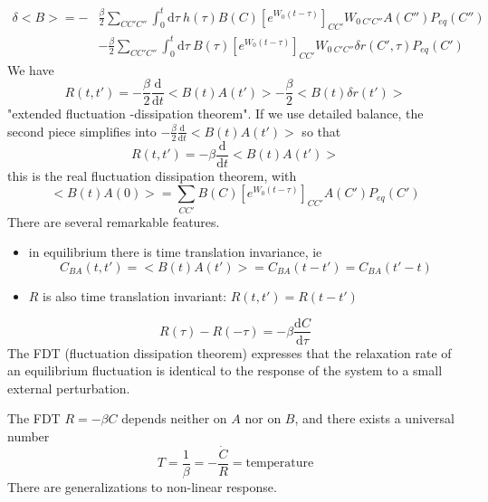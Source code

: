 \documentclass[a4paper]{book}
\theoremstyle{definition}
\theoremstyle{remark}
\begin{document}
\begin{equation}
    \begin{aligned}
        \delta <B> = -&\frac{\beta}{2} \sum_{CC'C''} \int_{0}^{t}\text{d}\tau ~ h(\tau) B(C)[e^{W_0(t - \tau)}]_{CC'}W_{0~C'C''} A(C'')P_{eq}(C'')   \\ 
    &- \frac{\beta}{2}\sum_{CC'C''} \int_{0}^{t}\text{d}\tau ~ B(\tau)[e^{W_0(t - \tau)}]_{CC'}W_{0~C'C''}\delta r(C', \tau) P_{eq}(C')
    \end{aligned}
\end{equation}
We have 
\begin{equation}
    R(t, t') = -\frac{\beta}{2} \frac{\text{d}}{\text{d}t}<B(t)A(t')> - \frac{\beta}{2}<B(t)\delta r(t')>
\end{equation}
"extended fluctuation -dissipation theorem". If we use detailed balance, the second piece simplifies into $-\frac{\beta}{2} \frac{\text{d}}{\text{d}t}<B(t)A(t')>$ so that 
\begin{equation}
    R(t, t') =-\beta \frac{\text{d}}{\text{d}t}<B(t)A(t')>
\end{equation}
this is the real fluctuation dissipation theorem, with 
\begin{equation}
    <B(t)A(0)> = \sum_{CC'}B(C)[e^{W_0(t - \tau)}]_{CC'}A(C') P_{eq}(C')
\end{equation}
There are several remarkable features. 
\begin{itemize}
    \item in equilibrium there is time translation invariance, ie $$C_{BA}(t, t') = <B(t)A(t')> = C_{BA}(t-t') = C_{BA}(t'-t)$$
    \item $R$ is also time translation invariant: $R(t, t') = R(t-t')$
\end{itemize}
\begin{equation}
    R(\tau) - R(-\tau) = -\beta \frac{\text{d}C}{\text{d}\tau}
\end{equation}
The FDT (fluctuation dissipation theorem) expresses that the relaxation rate of an equilibrium fluctuation is identical to the response of the system to a small external perturbation. \par \medskip 
The FDT $R = -\beta C$ depends neither on $A$ nor on $B$, and there exists a universal number 
\begin{equation}
    T = \frac{1}{\beta} = -\frac{\dot{C}}{R} = \text{temperature}
\end{equation}
There are generalizations to non-linear response. 
\end{document}
